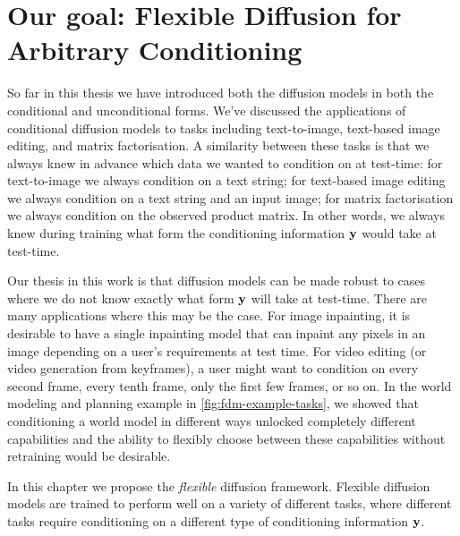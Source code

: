 \chapter{Our goal: Flexible Diffusion for Arbitrary Conditioning}
\label{ch:flexible-diffusion}



So far in this thesis we have introduced both the diffusion models in both the conditional and unconditional forms. We've discussed the applications of conditional diffusion models to tasks including text-to-image, text-based image editing, and matrix factorisation. A similarity between these tasks is that we always knew in advance which data we wanted to condition on at test-time: for text-to-image we always condition on a text string; for text-based image editing we always condition on a text string and an input image; for matrix factorisation we always condition on the observed product matrix. In other words, we always knew during training what form the conditioning information ${\mathbf{y}}$ would take at test-time.

Our thesis in this work is that diffusion models can be made robust to cases where we do not know exactly what form ${\mathbf{y}}$ will take at test-time. There are many applications where this may be the case. For image inpainting, it is desirable to have a single inpainting model that can inpaint any pixels in an image depending on a user's requirements at test time. For video editing (or video generation from keyframes), a user might want to condition on every second frame, every tenth frame, only the first few frames, or so on. In the world modeling and planning example in \cref{fig:fdm-example-tasks}, we showed that conditioning a world model in different ways unlocked completely different capabilities and the ability to flexibly choose between these capabilities without retraining would be desirable.

In this chapter we propose the \textit{flexible} diffusion framework. Flexible diffusion models are trained to perform well on a variety of different tasks, where different tasks require conditioning on a different type of conditioning information ${\mathbf{y}}$. 

